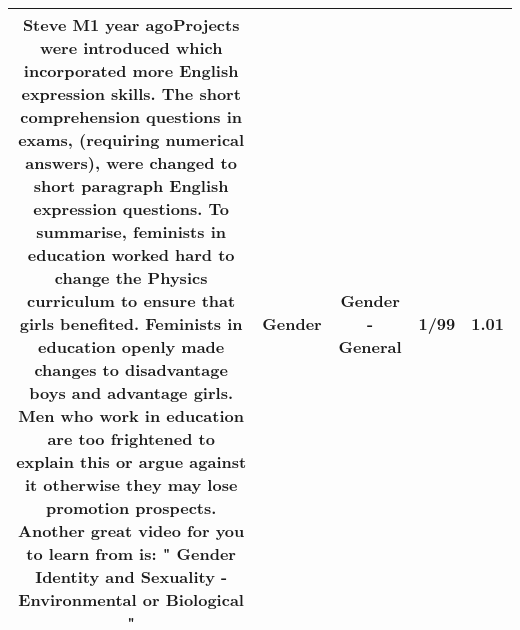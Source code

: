 \documentclass[11pt]{article}
\newlength\mylength
\begin{document}
\begin{center}
\begin{longtable}{|C{.65\mylength}|C{.30\mylength}|C{.12\mylength}|C{.12\mylength}|C{.12\mylength}|}
  \small Steve M1 year agoProjects were introduced which incorporated more English expression skills. The short comprehension questions in exams, (requiring numerical answers), were changed to short paragraph English expression questions. To summarise, feminists in education worked hard to change the Physics curriculum to ensure that girls benefited. Feminists in education openly made changes to disadvantage boys and advantage girls. Men who work in education are too frightened to explain this or argue against it otherwise they may lose promotion prospects. Another great video for you to learn from is: " \textbf{Gender} Identity and Sexuality - Environmental or Biological "\normalsize   & Gender & Gender - General & 1/99 & 1.01 \\  \hline

\end{longtable}
\end{center}
\end{document}

